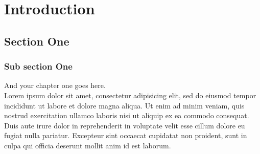 \chapter{Introduction}%
\label{chap:chap1}

\section{Section One}
\label{section:chap1:sec1}

  \subsection{Sub section One}
  And your chapter one goes here\cite{web001}\@. ~\\
  Lorem ipsum dolor sit amet, consectetur adipisicing elit, sed do eiusmod
  tempor incididunt ut labore et dolore magna aliqua. Ut enim ad minim veniam,
  quis nostrud exercitation ullamco laboris nisi ut aliquip ex ea commodo
  consequat. Duis aute irure dolor in reprehenderit in voluptate velit esse
  cillum dolore eu fugiat nulla pariatur. Excepteur sint occaecat cupidatat non
  proident, sunt in culpa qui officia deserunt mollit anim id est laborum.


